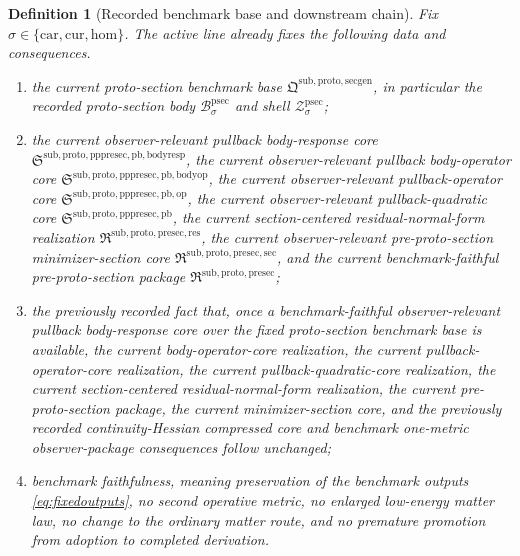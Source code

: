 \documentclass[11pt]{article}
\newcommand{\Car}{\mathrm{car}}
\newcommand{\Cur}{\mathrm{cur}}
\newcommand{\Hom}{\mathrm{hom}}
\newcommand{\ProtoSectionPackage}{\mathfrak Q^{\mathrm{sub,proto,secgen}}}
\newcommand{\ProtoSectionBody}[1]{\mathcal B_{#1}^{\mathrm{psec}}}
\newcommand{\ProtoSectionShell}[1]{\mathcal Z_{#1}^{\mathrm{psec}}}
\newcommand{\PreProtoSectionPackage}{\mathfrak R^{\mathrm{sub,proto,presec}}}
\newcommand{\PreProtoSectionMinSectionCore}{\mathfrak R^{\mathrm{sub,proto,presec,sec}}}
\newcommand{\PreProtoSectionResidualPackage}{\mathfrak R^{\mathrm{sub,proto,presec,res}}}
\newcommand{\PrePreProtoSectionPullbackCore}{\mathfrak S^{\mathrm{sub,proto,pppresec,pb}}}
\newcommand{\PullbackOperatorCore}{\mathfrak S^{\mathrm{sub,proto,pppresec,pb,op}}}
\newcommand{\PullbackBodyOperatorCore}{\mathfrak S^{\mathrm{sub,proto,pppresec,pb,bodyop}}}
\newcommand{\PullbackBodyResponseCore}{\mathfrak S^{\mathrm{sub,proto,pppresec,pb,bodyresp}}}
\newtheorem{definition}{Definition}
\begin{document}
\begin{definition}[Recorded benchmark base and downstream chain]
\label{def:downstream}
Fix \(\sigma\in\{\Car,\Cur,\Hom\}\). The active line already fixes the following data and consequences.
\begin{enumerate}
    \item the current proto-section benchmark base \(\ProtoSectionPackage\), in particular the recorded proto-section body \(\ProtoSectionBody{\sigma}\) and shell \(\ProtoSectionShell{\sigma}\);
    \item the current observer-relevant pullback body-response core \(\PullbackBodyResponseCore\), the current observer-relevant pullback body-operator core \(\PullbackBodyOperatorCore\), the current observer-relevant pullback-operator core \(\PullbackOperatorCore\), the current observer-relevant pullback-quadratic core \(\PrePreProtoSectionPullbackCore\), the current section-centered residual-normal-form realization \(\PreProtoSectionResidualPackage\), the current observer-relevant pre-proto-section minimizer-section core \(\PreProtoSectionMinSectionCore\), and the current benchmark-faithful pre-proto-section package \(\PreProtoSectionPackage\);
    \item the previously recorded fact that, once a benchmark-faithful observer-relevant pullback body-response core over the fixed proto-section benchmark base is available, the current body-operator-core realization, the current pullback-operator-core realization, the current pullback-quadratic-core realization, the current section-centered residual-normal-form realization, the current pre-proto-section package, the current minimizer-section core, and the previously recorded continuity-Hessian compressed core and benchmark one-metric observer-package consequences follow unchanged;
    \item benchmark faithfulness, meaning preservation of the benchmark outputs \eqref{eq:fixedoutputs}, no second operative metric, no enlarged low-energy matter law, no change to the ordinary matter route, and no premature promotion from adoption to completed derivation.
\end{enumerate}
\end{definition}
\end{document}
